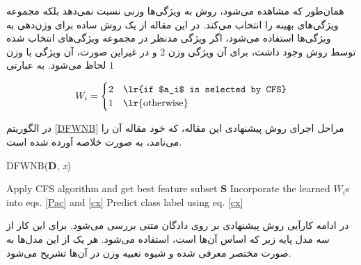 \documentclass[12pt, a4paper]{article}
\begin{document}
همان‌طور که مشاهده می‌شود، روش  به ویژگی‌ها وزنی نسبت نمی‌دهد بلکه \break
مجموعه ویژگی‌های بهینه را انتخاب می‌کند. در این مقاله از یک روش ساده برای وزن‌دهی به ویژگی‌ها استفاده می‌شود،
اگر ویژگی مدنظر در مجموعه ویژگی‌های انتخاب شده توسط روش  وجود داشت، برای آن ویژگی وزن $2$ و
در غیراین صورت، آن ویژگی با وزن $1$ لحاظ می‌شود. به عبارتی

\begin{eqnarray}
    W_i = \begin{cases}
        2 & \text{\lr{if $a_i$ is selected by CFS}}\\
        1 & \text{\lr{otherwise}}
    \end{cases}
\end{eqnarray}

در الگوریتم \ref{DFWNB} مراحل اجرای روش
پیشنهادی این مقاله، که خود مقاله آن را
می‌نامد، به صورت خلاصه آورده شده است.

\begin{latin}
    \begin{algorithm}
        \caption{DFWNB(\textbf{D}, \textit{x})}\label{alg:two}
        \label{DFWNB}

        Apply CFS algorithm and get best feature subset \textbf{S}\;
        Incorporate the learned $W_i$s into eqs. \ref{Pac} and \ref{cx}\;
        Predict class label using eq. \ref{cx}\;
    \end{algorithm}
\end{latin}

در ادامه کارآیی روش پیشنهادی بر روی دادگان متنی بررسی می‌شود. برای این کار از سه مدل
پایه زیر که اساس آن‌ها  است، استفاده می‌شود. هر یک از این مدل‌ها
به صورت مختصر معرفی شده و شیوه تعبیه وزن در آن‌ها تشریح می‌شود.
\end{document}
